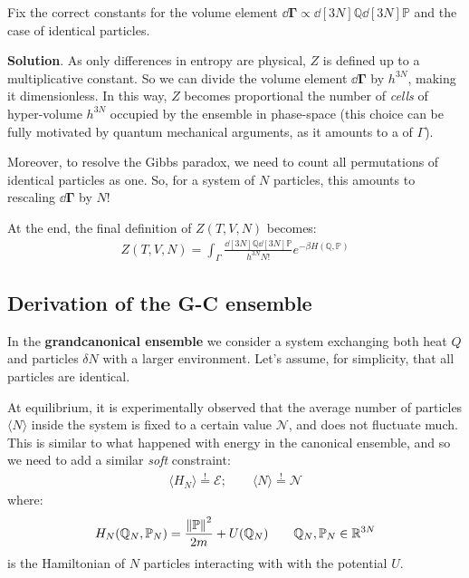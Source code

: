 \documentclass[../template.tex]{subfiles}
\begin{document}
\begin{exo}[2]
    Fix the correct constants for the volume element $\dd{\bm{\Gamma}} \propto \dd[3N]{\mathbb{Q}} \dd[3N]{\mathbb{P}}$ and the case of identical particles.

    \medskip

    \textbf{Solution}. As only differences in entropy are physical, $Z$ is defined up to a multiplicative constant. So we can divide the volume element $\dd{\bm{\Gamma}}$ by $h^{3N}$, making it dimensionless. In this way, $Z$ becomes proportional the number of \textit{cells} of hyper-volume $h^{3N}$ occupied by the ensemble in phase-space (this choice can be fully motivated by quantum mechanical arguments, as it amounts to a  of $\Gamma$).

    \medskip

    Moreover, to resolve the Gibbs paradox, we need to count all permutations of identical particles as one. So, for a system of $N$ particles, this amounts to rescaling $\dd{\bm{\Gamma}}$ by $N!$

    \medskip

    At the end, the final definition of $Z(T,V,N)$ becomes:
    \begin{align*}
        Z(T,V,N) = \int_{\Gamma} \frac{\dd[3N]{\mathbb{Q}} \dd[3N]{\mathbb{P}}}{h^{3N} N!} e^{-\beta H(\mathbb{Q}, \mathbb{P})} 
    \end{align*}
\end{exo}

\subsection{Derivation of the G-C ensemble}
In the \textbf{grandcanonical ensemble} we consider a system exchanging both heat $Q$ and particles $\delta N$ with a larger environment. Let's assume, for simplicity, that all particles are identical.

\medskip

At equilibrium, it is experimentally observed that the average number of particles $\langle N \rangle$ inside the system is fixed to a certain value $\mathcal{N}$, and does not fluctuate much. This is similar to what happened with energy in the canonical ensemble, and so we need to add a similar \textit{soft} constraint:
\begin{align}\label{eqn:36}
    \langle H_N \rangle \overset{!}{=}  \mathcal{E}; \qquad \langle N  \rangle \overset{!}{=}  \mathcal{N}
\end{align}
where:
\begin{align*}
    H_N(\mathbb{Q}_N, \mathbb{P}_N) = \frac{\norm{\mathbb{P}}^2}{2m} + U(\mathbb{Q}_N)  \qquad \mathbb{Q}_N, \mathbb{P}_N \in \mathbb{R}^{3N}
\end{align*}
is the Hamiltonian of $N$ particles interacting with with the potential $U$.
\end{document}
